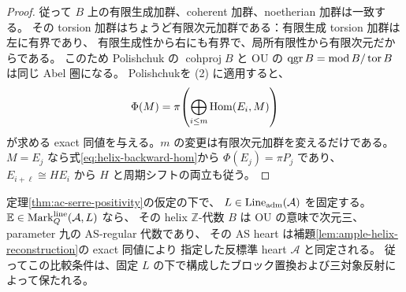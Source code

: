 \begin{proof}
従って $B$ 上の有限生成加群、coherent 加群、noetherian 加群は一致する。
その torsion 加群はちょうど有限次元加群である：有限生成 torsion 加群は左に有界であり、
有限生成性から右にも有界で、局所有限性から有限次元だからである。
このため Polishchuk の $\operatorname{cohproj}B$ と OU の
$\operatorname{qgr} B=\operatorname{mod}B/\operatorname{tor}B$ は同じ Abel 圏になる。
Polishchuk\cite[Theorem 2.4]{PolishchukProj}を (2) に適用すると、
\[
 \Phi(M)=\pi\!\left(\bigoplus_{i\le m}\operatorname{Hom}(E_i,M)\right)
\]
が求める exact 同値を与える。$m$ の変更は有限次元加群を変えるだけである。
$M=E_j$ なら式\eqref{eq:helix-backward-hom}から $\Phi(E_j)=\pi P_j$ であり、
$E_{i+\ell}\cong HE_i$ から $H$ と周期シフトの両立も従う。
\end{proof}

\begin{corollary}\label{cor:line-helix-as-reconstruction}
定理\ref{thm:ac-serre-positivity}の仮定の下で、
$L\in\operatorname{Line}_{\rm adm}(\mathcal A)$ を固定する。
$\mathbb E\in\operatorname{Mark}^{\rm line}_Q(\mathcal A,L)$ なら、
その helix $\mathbb Z$-代数 $B$ は OU の意味で次元三、parameter 九の AS-regular 代数であり、
その AS heart は補題\ref{lem:ample-helix-reconstruction}の exact 同値により
指定した反標準 heart $\mathcal A$ と同定される。
従ってこの比較条件は、固定 $L$ の下で構成したブロック置換および三対象反射によって保たれる。
\end{corollary}
